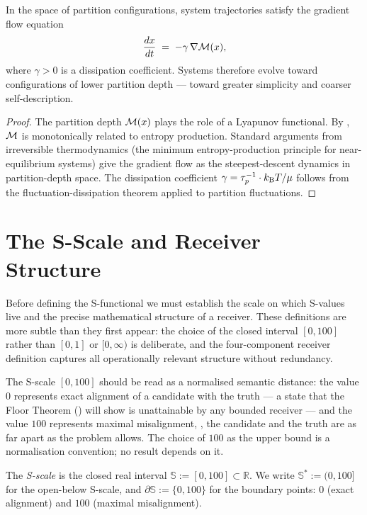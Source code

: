 \begin{proposition}
\label{prop:gradient-flow}
In the space of partition configurations, system trajectories satisfy the
gradient flow equation
\[
  \frac{dx}{dt} \;=\; -\gamma \,\nabla \mathcal{M}(x) ,
\]
where $\gamma > 0$ is a dissipation coefficient.  Systems therefore evolve
toward configurations of lower partition depth — toward greater simplicity
and coarser self-description.
\end{proposition}

\begin{proof}
The partition depth $\mathcal{M}(x)$ plays the role of a Lyapunov functional.
By , $\mathcal{M}$ is monotonically related to entropy
production.  Standard arguments from irreversible thermodynamics (the
minimum entropy-production principle for near-equilibrium systems) give the
gradient flow as the steepest-descent dynamics in partition-depth space.
The dissipation coefficient $\gamma = \tau_p^{-1} \cdot k_{\mathrm{B}} T / \mu$ follows
from the fluctuation-dissipation theorem applied to partition fluctuations.
\end{proof}

\section{The S-Scale and Receiver Structure}
\label{sec:s-scalar}

Before defining the S-functional we must establish the scale on which
S-values live and the precise mathematical structure of a receiver.  These
definitions are more subtle than they first appear: the choice of the closed
interval $[0, 100]$ rather than $[0, 1]$ or $[0, \infty)$ is deliberate,
and the four-component receiver definition captures all operationally
relevant structure without redundancy.

The S-scale $[0, 100]$ should be read as a normalised semantic distance: the
value $0$ represents exact alignment of a candidate with the truth — a state
that the Floor Theorem () will show is
unattainable by any bounded receiver — and the value $100$ represents maximal
misalignment, \ie, the candidate and the truth are as far apart as the
problem allows.  The choice of $100$ as the upper bound is a normalisation
convention; no result depends on it.

\begin{definition}[S-scale]
\label{def:s-scale}
The \emph{S-scale} is the closed real interval
$\mathbb{S} := [0, 100] \subset \mathbb{R}$.
We write $\mathbb{S}^{*} := (0, 100]$ for the open-below S-scale, and
$\partial \mathbb{S} := \{0, 100\}$ for the boundary points: $0$
(exact alignment) and $100$ (maximal misalignment).
\end{definition}

